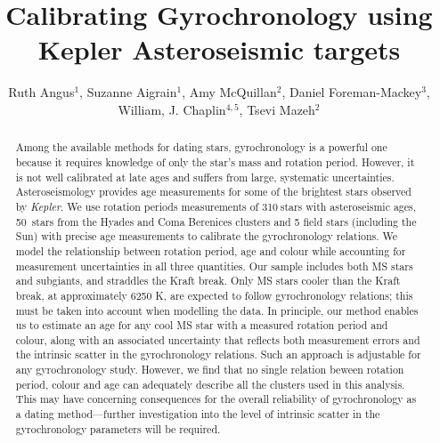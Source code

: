 \documentclass[10pt,preprint]{aastex}
\newcommand{\nastero}{310}
\newcommand{\nHC}{50~}
\begin{document}
\title{Calibrating Gyrochronology using Kepler Asteroseismic targets}

\author{Ruth Angus$^1$, Suzanne Aigrain$^1$, Amy McQuillan$^2$, Daniel Foreman-Mackey$^3$,  William, J. Chaplin$^{4, 5}$, Tsevi Mazeh$^2$}

\begin{abstract}
\label{abs}

Among the available methods for dating stars, gyrochronology is a powerful one because it requires knowledge of only the star's mass and rotation period.
However, it is not well calibrated at late ages and suffers from large, systematic uncertainties.
Asteroseismology provides age measurements for some of the brightest stars observed by {\it Kepler}.
We use rotation periods measurements of \nastero$~$stars with asteroseismic ages, \nHC stars from the Hyades and Coma Berenices clusters and 5 field stars (including the Sun) with precise age measurements to calibrate the gyrochronology relations.
We model the relationship between rotation period, age and colour while accounting for measurement uncertainties in all three quantities.
Our sample includes both MS stars and subgiants, and straddles the Kraft break.
Only MS stars cooler than the Kraft break, at approximately 6250 K, are expected to follow gyrochronology relations; this must be taken into account when modelling the data.
In principle, our method enables us to estimate an age for any cool MS star with a measured rotation period and colour, along with an associated uncertainty that reflects both measurement errors and the intrinsic scatter in the gyrochronology relations.
Such an approach is adjustable for any gyrochronology study.
However, we find that no single relation beween rotation period, colour and age can adequately describe all the clusters used in this analysis.
This may have concerning consequences for the overall reliability of gyrochronology as a dating method---further investigation into the level of intrinsic scatter in the gyrochronology parameters will be required.

\end{abstract}
\end{document}
